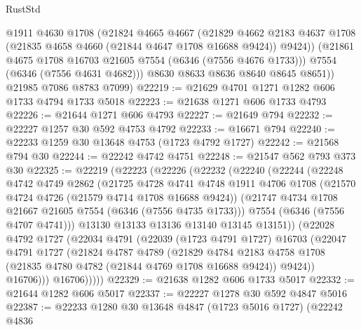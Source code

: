 \begin{lexlean}{RustStd}
\begin{coremodule}
            @1911
            @4630
            @1708
            (@21824
              @4665
              @4667
              (@21829
                @4662
                @2183
                @4637
                @1708
                (@21835 @4658 @4660 (@21844 @4647 @1708 @16688 @9424))
                @9424))
            (@21861 @4675 @1708 @16703 @21605 @7554 (@6346 (@7556 @4676 @1733)))
            @7554
            (@6346 (@7556 @4631 @4682)))
          @8630
          @8633
          @8636
          @8640
          @8645
          @8651))
      @21985
      @7086
      @8783
      @7099)
@22219 := @21629 @4701 @1271 @1282 @606 @1733 @4794 @1733 @5018
@22223 := @21638 @1271 @606 @1733 @4793
@22226 := @21644 @1271 @606 @4793
@22227 := @21649 @794
@22232 := @22227 @1257 @30 @592 @4753 @4792
@22233 := @16671 @794
@22240 := @22233 @1259 @30 @13648 @4753 (@1723 @4792 @1727)
@22242 := @21568 @794 @30
@22244 := @22242 @4742 @4751
@22248 := @21547 @562 @793 @373 @30
@22325 := @22219
    (@22223
      (@22226
        (@22232
          (@22240
            (@22244
              (@22248
                @4742
                @4749
                @2862
                (@21725
                  @4728
                  @4741
                  @4748
                  @1911
                  @4706
                  @1708
                  (@21570 @4724 @4726 (@21579 @4714 @1708 @16688 @9424))
                  (@21747 @4734 @1708 @21667 @21605 @7554 (@6346 (@7556 @4735 @1733)))
                  @7554
                  (@6346 (@7556 @4707 @4741)))
                @13130
                @13133
                @13136
                @13140
                @13145
                @13151))
            (@22028
              @4792
              @1727
              (@22034
                @4791
                (@22039
                  (@1723 @4791 @1727)
                  @16703
                  (@22047
                    @4791
                    @1727
                    (@21824
                      @4787
                      @4789
                      (@21829
                        @4784
                        @2183
                        @4758
                        @1708
                        (@21835 @4780 @4782 (@21844 @4769 @1708 @16688 @9424))
                        @9424))
                    @16706)))
              @16706)))))
@22329 := @21638 @1282 @606 @1733 @5017
@22332 := @21644 @1282 @606 @5017
@22337 := @22227 @1278 @30 @592 @4847 @5016
@22387 := @22233
    @1280
    @30
    @13648
    @4847
    (@1723 @5016 @1727)
    (@22242
      @4836

\end{coremodule}
\end{lexlean}
